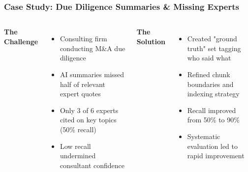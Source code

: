 \begin{frame}
    \frametitle{Case Study: Due Diligence Summaries \& Missing Experts}
    
    \begin{columns}
        \textbf{The Challenge}
        \begin{itemize}
            \item Consulting firm conducting M\&A due diligence
            \item AI summaries missed half of relevant expert quotes
            \item Only 3 of 6 experts cited on key topics (50\% recall)
            \item Low recall undermined consultant confidence
        \end{itemize}
        
        \textbf{The Solution}
        \begin{itemize}
            \item Created "ground truth" set tagging who said what
            \item Refined chunk boundaries and indexing strategy
            \item Recall improved from 50\% to 90\%
            \item Systematic evaluation led to rapid improvement
        \end{itemize}
    \end{columns}
    
    \vspace{0.3cm}
    \begin{center}
    \end{center}
\end{frame} 
